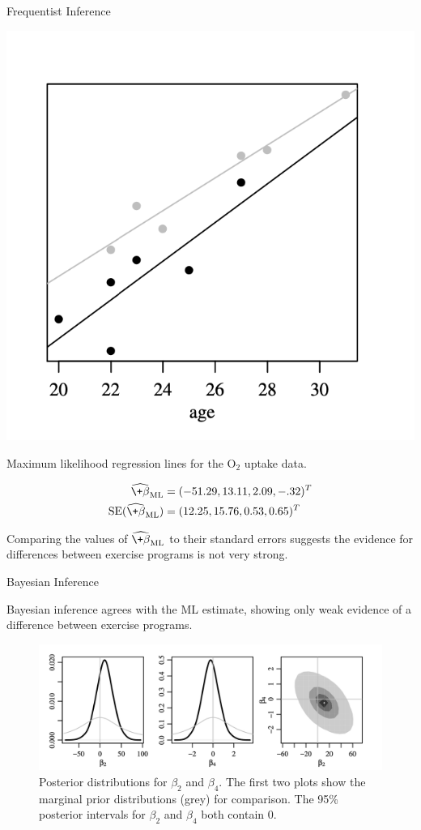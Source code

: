 \documentclass[10pt]{beamer}
\begin{document}
\begin{frame}{Frequentist Inference}
	
\begin{center}
\includegraphics[width=.4\textwidth]{images/hoff_exercise_program_OLS_lines}

\scriptsize Maximum likelihood regression lines for the $\text{O}_2$ uptake data.
\end{center}

\begin{align*}
\widehat{\+\beta}_{\text{ML}} &= (-51.29, 13.11, 2.09, -.32)^T \\
\text{SE}(\widehat{\+\beta}_{\text{ML}} )& = (12.25, 15.76, 0.53, 0.65)^T 
\end{align*}

\scriptsize Comparing the values of $\widehat{\+\beta}_{\text{ML}}$ to their standard errors suggests the evidence for differences between exercise programs is not very strong.
\end{frame}


\begin{frame}{Bayesian Inference}
	
Bayesian inference agrees with the ML estimate, showing only weak evidence of a difference between exercise programs.

 \begin{figure}
\centering
\includegraphics[width=.8\textwidth]{images/hoff_exercise_program_posteriors}
\caption{Posterior distributions for $\beta_2$ and $\beta_4$. The first two plots show the marginal prior distributions (grey) for comparison. The 95\% posterior intervals for $\beta_2$ and $\beta_4$ both contain 0.}
\end{figure}


\end{frame}
\end{document}
